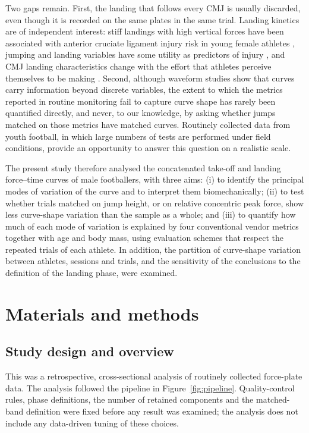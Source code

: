Two gaps remain. First, the landing that follows every CMJ is usually discarded, even though it is recorded on the same plates in the same trial. Landing kinetics are of independent interest: stiff landings with high vertical forces have been associated with anterior cruciate ligament injury risk in young female athletes \citep{leppanen2017}, jumping and landing variables have some utility as predictors of injury \citep{pedley2020}, and CMJ landing characteristics change with the effort that athletes perceive themselves to be making \citep{hite2025}. Second, although waveform studies show that curves carry information beyond discrete variables, the extent to which the metrics reported in routine monitoring fail to capture curve shape has rarely been quantified directly, and never, to our knowledge, by asking whether jumps matched on those metrics have matched curves. Routinely collected data from youth football, in which large numbers of tests are performed under field conditions, provide an opportunity to answer this question on a realistic scale.

The present study therefore analysed the concatenated take-off and landing force--time curves of male footballers, with three aims: (i) to identify the principal modes of variation of the curve and to interpret them biomechanically; (ii) to test whether trials matched on jump height, or on relative concentric peak force, show less curve-shape variation than the sample as a whole; and (iii) to quantify how much of each mode of variation is explained by four conventional vendor metrics together with age and body mass, using evaluation schemes that respect the repeated trials of each athlete. In addition, the partition of curve-shape variation between athletes, sessions and trials, and the sensitivity of the conclusions to the definition of the landing phase, were examined.

\section{Materials and methods}

\subsection{Study design and overview}

This was a retrospective, cross-sectional analysis of routinely collected force-plate data. The analysis followed the pipeline in Figure~\ref{fig:pipeline}. Quality-control rules, phase definitions, the number of retained components and the matched-band definition were fixed before any result was examined; the analysis does not include any data-driven tuning of these choices.

